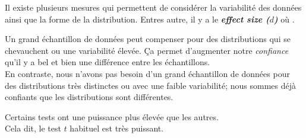\documentclass[10pt, french]{article}
\begin{document}
\begin{multicols*}{2}
\begin{definitionNOHFILLsub}
\begin{itemize}
\begin{center}
		\end{center}
\end{itemize}
\end{definitionNOHFILLsub}

Il existe plusieurs mesures qui permettent de considérer la variabilité des données ainsi que la forme de la distribution. Entres autre, il y a le \og \textit{\textbf{effect size ($d$)}} \fg{} où .

\begin{definitionNOHFILLsub}
Un grand échantillon de données peut compenser pour des distributions qui se chevauchent ou une variabilité élevée. Ça permet d'augmenter notre \textit{confiance} qu'il y a bel et bien une différence entre les échantillons. \\

En contraste, nous n'avons pas besoin d'un grand échantillon de données pour des distributions très distinctes ou avec une faible variabilité; nous sommes déjà confiants que les distributions sont différentes.
\end{definitionNOHFILLsub}

\begin{definitionNOHFILLsub}
Certains tests ont une puissance plus élevée que les autres. \\
Cela dit, le test $t$ habituel est très puissant.
\end{definitionNOHFILLsub}


\end{multicols*}
\end{document}
